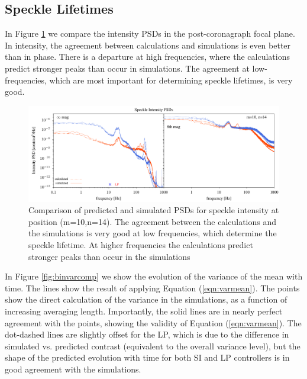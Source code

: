 \documentclass[11pt,preprint]{aastex}
\begin{document}
\subsection{Speckle Lifetimes}

In Figure \ref{fig:sppsdcomp} we compare the intensity PSDs in the post-coronagraph focal plane.  In intensity, the agreement between calculations and simulations is even better than in phase.  There is a departure at high frequencies, where the calculations predict stronger peaks than occur in simulations. The agreement at low-frequencies, which are most important for determining speckle lifetimes, is very good.

\begin{figure}
\hspace{-0.3in}
\includegraphics[width=6.5in]{spPsdComp_lp_10_14.pdf}
\caption{Comparison of predicted and simulated PSDs for speckle intensity at position (m=10,n=14).  The agreement between the calculations and the simulations is very good at low frequencies, which determine the speckle lifetime.  At higher frequencies the calculations predict stronger peaks than occur in the simulations  \label{fig:sppsdcomp}}
\end{figure}

In Figure \ref{fig:binvarcomp} we show the evolution of the variance of the mean with time.  The lines show the result of applying Equation (\ref{eqn:varmean}). The points show the direct calculation of the variance in the simulations, as a function of increasing averaging length.  Importantly, the solid lines are in nearly perfect agreement with the points, showing the validity of Equation (\ref{eqn:varmean}).  The dot-dashed lines are slightly offset for the LP, which is due to the difference in simulated vs. predicted contrast (equivalent to the overall variance level), but the shape of the predicted evolution with time for both SI and LP controllers is in good agreement with the simulations.
\end{document}
